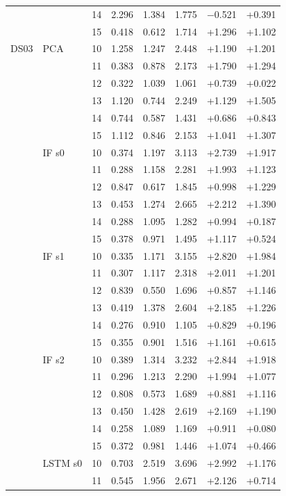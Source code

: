 \begin{footnotesize}
\begin{longtable}{lllrrrrr}
 &  & 14 & 2.296 & 1.384 & 1.775 & $-$0.521 & +0.391 \\
 &  & 15 & 0.418 & 0.612 & 1.714 & +1.296 & +1.102 \\
\midrule
DS03 & PCA & 10 & 1.258 & 1.247 & 2.448 & +1.190 & +1.201 \\
 &  & 11 & 0.383 & 0.878 & 2.173 & +1.790 & +1.294 \\
 &  & 12 & 0.322 & 1.039 & 1.061 & +0.739 & +0.022 \\
 &  & 13 & 1.120 & 0.744 & 2.249 & +1.129 & +1.505 \\
 &  & 14 & 0.744 & 0.587 & 1.431 & +0.686 & +0.843 \\
 &  & 15 & 1.112 & 0.846 & 2.153 & +1.041 & +1.307 \\
 & IF s0 & 10 & 0.374 & 1.197 & 3.113 & +2.739 & +1.917 \\
 &  & 11 & 0.288 & 1.158 & 2.281 & +1.993 & +1.123 \\
 &  & 12 & 0.847 & 0.617 & 1.845 & +0.998 & +1.229 \\
 &  & 13 & 0.453 & 1.274 & 2.665 & +2.212 & +1.390 \\
 &  & 14 & 0.288 & 1.095 & 1.282 & +0.994 & +0.187 \\
 &  & 15 & 0.378 & 0.971 & 1.495 & +1.117 & +0.524 \\
 & IF s1 & 10 & 0.335 & 1.171 & 3.155 & +2.820 & +1.984 \\
 &  & 11 & 0.307 & 1.117 & 2.318 & +2.011 & +1.201 \\
 &  & 12 & 0.839 & 0.550 & 1.696 & +0.857 & +1.146 \\
 &  & 13 & 0.419 & 1.378 & 2.604 & +2.185 & +1.226 \\
 &  & 14 & 0.276 & 0.910 & 1.105 & +0.829 & +0.196 \\
 &  & 15 & 0.355 & 0.901 & 1.516 & +1.161 & +0.615 \\
 & IF s2 & 10 & 0.389 & 1.314 & 3.232 & +2.844 & +1.918 \\
 &  & 11 & 0.296 & 1.213 & 2.290 & +1.994 & +1.077 \\
 &  & 12 & 0.808 & 0.573 & 1.689 & +0.881 & +1.116 \\
 &  & 13 & 0.450 & 1.428 & 2.619 & +2.169 & +1.190 \\
 &  & 14 & 0.258 & 1.089 & 1.169 & +0.911 & +0.080 \\
 &  & 15 & 0.372 & 0.981 & 1.446 & +1.074 & +0.466 \\
 & LSTM s0 & 10 & 0.703 & 2.519 & 3.696 & +2.992 & +1.176 \\
 &  & 11 & 0.545 & 1.956 & 2.671 & +2.126 & +0.714 \\

\end{longtable}
\end{footnotesize}
